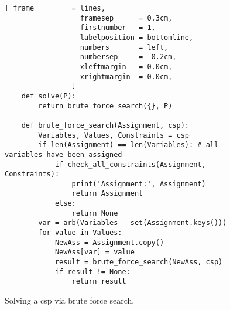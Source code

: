 \begin{figure}[!ht]
\centering
\begin{Verbatim}[ frame         = lines, 
                  framesep      = 0.3cm, 
                  firstnumber   = 1,
                  labelposition = bottomline,
                  numbers       = left,
                  numbersep     = -0.2cm,
                  xleftmargin   = 0.0cm,
                  xrightmargin  = 0.0cm,
                ]
    def solve(P):
        return brute_force_search({}, P)

    def brute_force_search(Assignment, csp):
        Variables, Values, Constraints = csp
        if len(Assignment) == len(Variables): # all variables have been assigned
            if check_all_constraints(Assignment, Constraints):
                print('Assignment:', Assignment)
                return Assignment
            else:
                return None
        var = arb(Variables - set(Assignment.keys()))
        for value in Values:
            NewAss = Assignment.copy()
            NewAss[var] = value
            result = brute_force_search(NewAss, csp)
            if result != None:
                return result
\end{Verbatim}
\vspace*{-0.3cm}
\caption{Solving a \ac{csp} via brute force search.}
\label{fig:Brute-Force-Solver.ipynb}
\end{figure}

